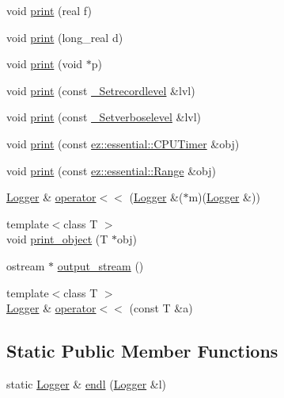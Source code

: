 \begin{DoxyCompactItemize}
void \hyperlink{classez_1_1logging_1_1Logger_a422fea2abd8a7c364e1c4846693422f1}{print} (real f)
\item 
void \hyperlink{classez_1_1logging_1_1Logger_a026763cd0c90ec5e4b5d06f08b63a140}{print} (long\+\_\+real d)
\item 
void \hyperlink{classez_1_1logging_1_1Logger_a5c8c3349b7d4aa76dfe90b1e3dc0ce00}{print} (void $\ast$p)
\item 
void \hyperlink{classez_1_1logging_1_1Logger_a3fcf2f4da96bd7a0fd33b055a23fdef3}{print} (const \hyperlink{structez_1_1logging_1_1__Setrecordlevel}{\+\_\+\+Setrecordlevel} \&lvl)
\item 
void \hyperlink{classez_1_1logging_1_1Logger_a20117d944ec1fa0aa3302981c620d8b6}{print} (const \hyperlink{structez_1_1logging_1_1__Setverboselevel}{\+\_\+\+Setverboselevel} \&lvl)
\item 
void \hyperlink{classez_1_1logging_1_1Logger_a5660d40a1364e37393b3241435ed5a64}{print} (const \hyperlink{classez_1_1essential_1_1CPUTimer}{ez\+::essential\+::\+C\+P\+U\+Timer} \&obj)
\item 
void \hyperlink{classez_1_1logging_1_1Logger_ad95b97a1ff61d4a31a0fba5e32f805a8}{print} (const \hyperlink{classez_1_1essential_1_1Range}{ez\+::essential\+::\+Range} \&obj)
\item 
\hyperlink{classez_1_1logging_1_1Logger}{Logger} \& \hyperlink{classez_1_1logging_1_1Logger_a439b87c1fdbfe851afcb3cfb29534437}{operator$<$$<$} (\hyperlink{classez_1_1logging_1_1Logger}{Logger} \&($\ast$m)(\hyperlink{classez_1_1logging_1_1Logger}{Logger} \&))
\item 
{\footnotesize template$<$class T $>$ }\\void \hyperlink{classez_1_1logging_1_1Logger_ab81b4be85f103d81e7b25a9cdf0a68e3}{print\+\_\+object} (T $\ast$obj)
\item 
ostream $\ast$ \hyperlink{classez_1_1logging_1_1Logger_a5d7092dd639907ccd702eb0df062821b}{output\+\_\+stream} ()
\item 
{\footnotesize template$<$class T $>$ }\\\hyperlink{classez_1_1logging_1_1Logger}{Logger} \& \hyperlink{classez_1_1logging_1_1Logger_a75006590ec6d4d6c8bca7d8824d887c2}{operator$<$$<$} (const T \&a)
\end{DoxyCompactItemize}
\subsection*{Static Public Member Functions}
\begin{DoxyCompactItemize}
\item 
static \hyperlink{classez_1_1logging_1_1Logger}{Logger} \& \hyperlink{classez_1_1logging_1_1Logger_a69ba6cf7130aa70caeca9f5c8636e05a}{endl} (\hyperlink{classez_1_1logging_1_1Logger}{Logger} \&l)
\end{DoxyCompactItemize}
